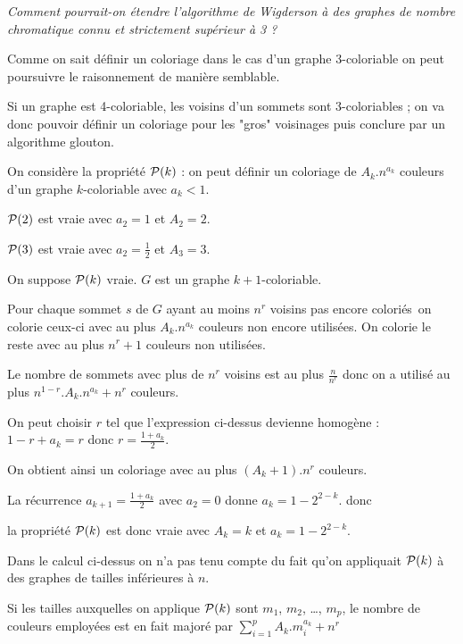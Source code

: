 \begin{Exercise}[title=Gag !] \it 
Comment pourrait-on étendre l'algorithme de Wigderson à des graphes de nombre chromatique connu et strictement supérieur à 3 ? 
\end{Exercise} 
\begin{Answer}Comme on sait définir un coloriage dans le cas d'un graphe 3-coloriable on peut poursuivre le raisonnement de manière semblable.

Si un graphe est 4-coloriable, les voisins d'un sommets sont 3-coloriables ; on va donc pouvoir définir un coloriage pour les "gros" voisinages puis conclure par un algorithme glouton.

On considère la propriété ${\cal P}(k)$ : 
on peut définir un coloriage de $A_k.n^{a_k}$ couleurs d'un graphe $k$-coloriable avec $a_k< 1$.

${\cal P}(2)$ est vraie avec $a_2=1$ et $A_2=2$.

${\cal P}(3)$ est vraie avec $a_2=\frac 12$ et $A_3=3$.

On suppose ${\cal P}(k)$ vraie. $G$ est un graphe $k+1$-coloriable.

Pour chaque sommet $s$ de $G$ ayant au moins $n^r$ voisins pas encore coloriés on colorie ceux-ci avec au plus $A_k.n^{a_k}$ couleurs non encore utilisées. On colorie le reste avec au plus $n^r+1$ couleurs non utilisées.

Le nombre de sommets avec plus de $n^r$ voisins est au plus $\frac n{n^r}$ donc on a utilisé au plus
$n^{1-r}.A_k.n^{a_k} + n^r$ couleurs.

On peut choisir $r$ tel que l'expression ci-dessus devienne homogène : $1-r+a_k = r$ donc $r = \frac {1+a_k}2$.

On obtient ainsi un coloriage avec au plus $(A_k+1).n^r$ couleurs.

La récurrence $a_{k+1} = \frac {1+a_k}2$ avec $a_2=0$ donne $a_k=1- 2^{2-k}$. donc 

la propriété ${\cal P}(k)$ est donc vraie avec $A_k=k$ et $a_k = 1- 2^{2-k}$.

\medskip

Dans le calcul ci-dessus on n'a pas tenu compte du fait qu'on appliquait ${\cal P}(k)$ à des graphes de tailles inférieures à $n$. 

Si les tailles auxquelles on applique ${\cal P}(k)$ sont $m_1$, $m_2$, \dots, $m_p$, le nombre de couleurs employées est en fait majoré par
$\displaystyle \sum_{i=1}^p A_k.m_i^{a_k}+n^r$


\end{Answer}
